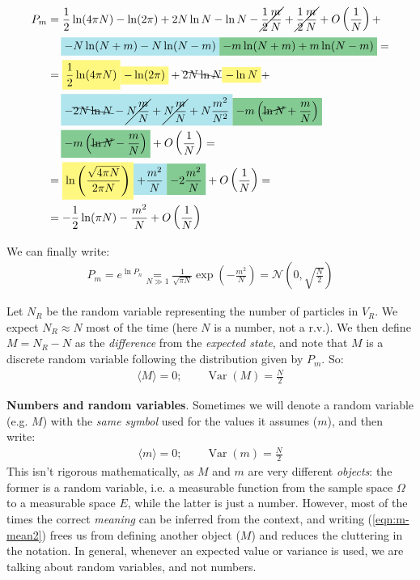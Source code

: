 \documentclass[../../main.tex]{subfiles}
\begin{document}
\begin{align*}
P_m &= \frac{1}{2} \ln(4 \pi N) - \ln(2 \pi) + 2 N \ln N - \ln N -\cancel{\frac{1}{2} \frac{m}{N}} + \cancel{\frac{1}{2}\frac{m}{N} }+ O\left(\frac{1}{N} \right) +\\
&\quad \> \hlc{SkyBlue}{-N \ln (N+m) - N \ln(N-m)} \hlc{ForestGreen}{- m \ln(N+m) + m \ln(N-m)} =\\
&= \hlc{Yellow}{\frac{1}{2} \ln(4 \pi N)} \hlc{Yellow}{- \ln(2 \pi)} + \bcancel{2N \ln N} \hlc{Yellow}{- \ln N }+\\
&\quad \> \hlc{SkyBlue}{-\bcancel{2N \ln N} - \cancel{N \frac{m}{N}} + \cancel{N \frac{m}{N}} + N \frac{m^2}{N^2}} \hlc{ForestGreen}{- m\left(\cancel{\ln N} + \frac{m}{N} \right)} \\
&\quad \> \hlc{ForestGreen}{- m\left(\cancel{\ln N} - \frac{m}{N} \right) }+ O\left(\frac{1}{N} \right) =\\
&= \hlc{Yellow}{\ln \left(\frac{\sqrt{4 \pi N}}{2 \pi N} \right) }\hlc{SkyBlue}{+  \frac{m^2}{N} }\hlc{ForestGreen}{-2\frac{m^2}{N}} + O\left(\frac{1}{N} \right) =\\
&= - \frac{1}{2} \ln (\pi N) - \frac{m^2}{N} + O\left(\frac{1}{N} \right)  
\end{align*}

We can finally write:
\begin{align}\label{eqn:m-gaussian}
    P_m = e^{\ln P_n} \underset{N \gg 1}{=}  \frac{1}{\sqrt{\pi N}} \exp\left(-\frac{m^2}{N} \right) = \mathcal{N}\left(0, \sqrt{\frac{N}{2} }\right)
\end{align}

Let $N_R$ be the random variable representing the number of particles in $V_R$. We expect $N_R \approx N$ most of the time (here $N$ is a number, not a r.v.). We then define $M = N_R - N$ as the \textit{difference} from the \textit{expected state}, and note that $M$ is a discrete random variable following the distribution given by $P_m$. So:
\begin{align}
    \langle M \rangle = 0; \qquad \operatorname{Var}(M) = \frac{N}{2} \label{eqn:m-mean}
\end{align} 

\begin{appr}
    \textbf{Numbers and random variables}. Sometimes we will denote a random variable (e.g. $M$) with the \textit{same symbol} used for the values it assumes ($m$), and then write:
    \begin{align} \label{eqn:m-mean2}
        \langle m \rangle = 0; \qquad \operatorname{Var}(m) = \frac{N}{2}  
    \end{align} 
    This isn't rigorous mathematically, as $M$ and $m$ are very different \textit{objects}: the former is a random variable, i.e. a measurable function from the sample space $\Omega$ to a measurable space $E$, while the latter is just a number. However, most of the times the correct \textit{meaning} can be inferred from the context, and writing (\ref{eqn:m-mean2}) frees us from defining another object ($M$) and reduces the cluttering in the notation. In general, whenever an expected value or variance is used, we are talking about random variables, and not numbers.
\end{appr}
\end{document}
